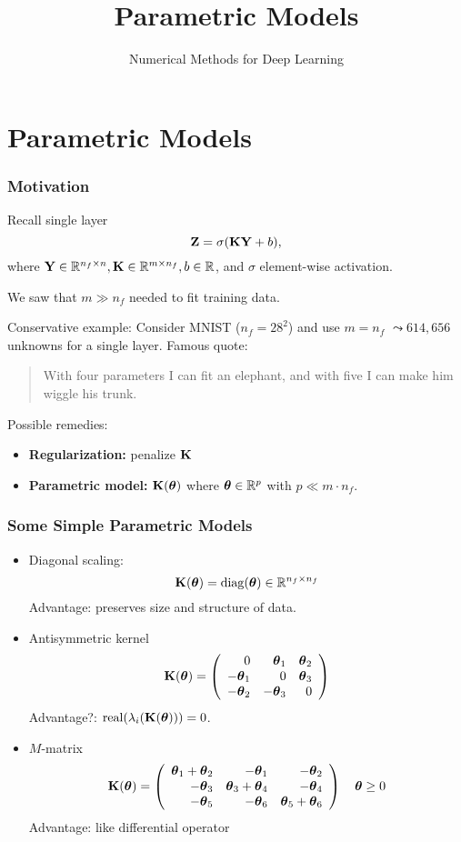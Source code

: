 \documentclass[12pt,fleqn,handout]{beamer}
\title{Parametric Models}
\subtitle{Numerical Methods for Deep Learning}
\date{}
\begin{document}
\makebeamertitle

\section{Parametric Models} %
\label{sec:parametric_models}
\begin{frame}[fragile]\frametitle{Motivation}

Recall single layer
$$
	{\bf Z} = \sigma({\bf K}{\bf Y} + b),
$$
where ${\bf Y} \in \mathbb{R}^{n_f\times n}, {\bf K} \in \mathbb{R}^{m \times n_f}, b\in\mathbb{R}$, and $\sigma$ element-wise activation. 

\bigskip
\pause

We saw that $m \gg n_f$ needed to fit training data. 

Conservative example: Consider MNIST ($n_f = 28^2$) and use $m=n_f$ $\leadsto 614,656$ unknowns for a single layer. \pause Famous quote:

\begin{quote}
	With four parameters I can fit an elephant, and with five I can make him wiggle his trunk.
\end{quote}

\bigskip
\pause

Possible remedies:
\begin{itemize}
	\item \textbf{Regularization:} penalize ${\bf K}$ 
	\item \textbf{Parametric model:} ${\bf K}({\boldsymbol \theta})$ where ${\boldsymbol \theta}\in\mathbb{R}^p$ with $p\ll m\cdot n_f$.
\end{itemize}
\end{frame}

\begin{frame}\frametitle{Some Simple Parametric Models}
	
	\begin{itemize}
		\item Diagonal scaling:
		$$
			{\bf K}({\boldsymbol \theta}) = {\rm diag}({\boldsymbol \theta}) \in \mathbb{R}^{n_f\times n_f}
		$$
		Advantage: preserves size and structure of data.
		\pause
		\item Antisymmetric kernel
		$$
			{\bf K}({\boldsymbol \theta}) = \left(
				\begin{array}{rrr}
					0 & {\boldsymbol \theta}_1 & {\boldsymbol \theta}_2 \\
					-{\boldsymbol \theta}_1 & 0 & {\boldsymbol \theta}_3 \\
					-{\boldsymbol \theta}_2 & -{\boldsymbol \theta}_3 & 0
				\end{array}
			\right)
		$$
		Advantage?: ${\rm real}(\lambda_i({\bf K}({\boldsymbol \theta}))) = 0$. 
		\pause
		\item $M$-matrix
		$$
		{\bf K}({\boldsymbol \theta}) = \left(
				\begin{array}{rrr}
					{\boldsymbol \theta}_1+{\boldsymbol \theta}_2 & -{\boldsymbol \theta}_1 & -{\boldsymbol \theta}_2 \\
					-{\boldsymbol \theta}_3 & {\boldsymbol \theta}_3 + {\boldsymbol \theta}_4 & -{\boldsymbol \theta}_4 \\
					-{\boldsymbol \theta}_5 & -{\boldsymbol \theta}_6 & {\boldsymbol \theta}_5+{\boldsymbol \theta}_6
				\end{array}
			\right)
			\quad {\boldsymbol \theta} \geq 0
		$$
		Advantage: like differential operator
	\end{itemize}
\end{frame}
\end{document}
